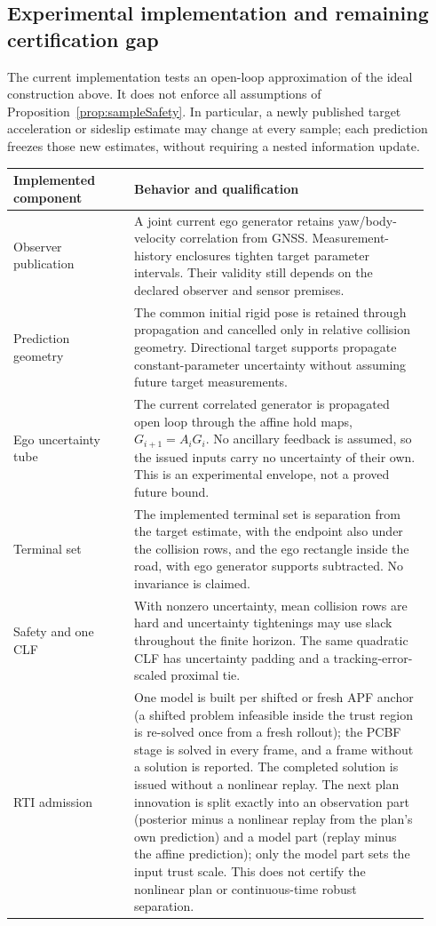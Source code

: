\documentclass[10pt,letterpaper]{article}
\begin{document}
\subsection{Experimental implementation and remaining certification gap}
The current implementation tests an open-loop approximation of the ideal
construction above. It does not enforce all assumptions of
Proposition~\ref{prop:sampleSafety}. In particular, a newly published target acceleration or
sideslip estimate may change at every sample; each prediction freezes those
new estimates, without requiring a nested information update.

\begin{longtable}{p{0.27\linewidth}p{0.66\linewidth}}
\toprule
Implemented component & Behavior and qualification \\\midrule
\endhead
Observer publication
& A joint current ego generator retains yaw/body-velocity correlation from
GNSS. Measurement-history enclosures tighten target parameter intervals.
Their validity still depends on the declared observer and sensor premises. \\
Prediction geometry
& The common initial rigid pose is retained through propagation and cancelled
only in relative collision geometry. Directional target supports propagate
constant-parameter uncertainty without assuming future target measurements. \\
Ego uncertainty tube
& The current correlated generator is propagated open loop through the affine
hold maps, $G_{i+1}=A_iG_i$. No ancillary feedback is assumed, so the issued
inputs carry no uncertainty of their own. This is an experimental envelope,
not a proved future bound. \\
Terminal set
& The implemented terminal set is separation from the target estimate, with
the endpoint also under the collision rows, and the ego rectangle inside the
road, with ego generator supports subtracted. No invariance is claimed. \\
Safety and one CLF
& With nonzero uncertainty, mean collision rows are hard and uncertainty
tightenings may use slack throughout the finite horizon. The same quadratic
CLF has uncertainty padding and a tracking-error-scaled proximal tie. \\
RTI admission
& One model is built per shifted or fresh APF anchor (a shifted problem infeasible inside the trust region is re-solved once from a
fresh rollout); the PCBF stage is solved in every frame, and a frame without a solution is reported. The completed
solution is issued without a nonlinear replay. The next plan innovation is split exactly
into an observation part (posterior minus a nonlinear replay from the plan's own
prediction) and a model part (replay minus the affine prediction); only the
model part sets the input trust scale. This
does not certify the nonlinear plan or continuous-time robust separation. \\
\bottomrule
\end{longtable}
\end{document}
